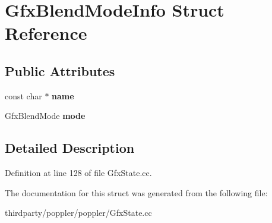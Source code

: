 \hypertarget{struct_gfx_blend_mode_info}{}\section{Gfx\+Blend\+Mode\+Info Struct Reference}
\label{struct_gfx_blend_mode_info}
\subsection*{Public Attributes}
\begin{DoxyCompactItemize}
\item 
\mbox{\label{struct_gfx_blend_mode_info_a0c28e77632af5491e8fd504ba7a7e67e}} 
const char $\ast$ {\bfseries name}
\item 
\mbox{\label{struct_gfx_blend_mode_info_adfa42a5ee15717b30636aaa6a436c6f4}} 
Gfx\+Blend\+Mode {\bfseries mode}
\end{DoxyCompactItemize}


\subsection{Detailed Description}


Definition at line 128 of file Gfx\+State.\+cc.



The documentation for this struct was generated from the following file\+:\begin{DoxyCompactItemize}
\item 
thirdparty/poppler/poppler/Gfx\+State.\+cc\end{DoxyCompactItemize}
